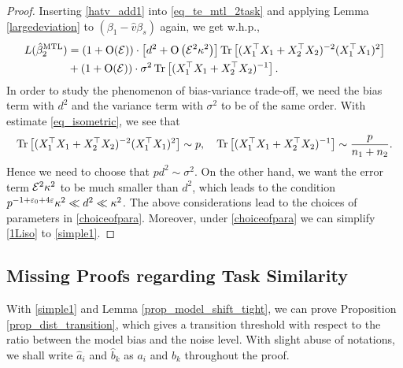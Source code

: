 \begin{proof}
Inserting \eqref{hatv_add1} into \eqref{eq_te_mtl_2task} and applying Lemma  \ref{largedeviation} to $(\beta_1-\hat v\beta_s)$ again, we get w.h.p.,
\begin{align}
\te(\hat{\beta}_2^{\MTL})&=(1+\OO(\cal E))\cdot \left[d^2 + \OO\left(\cal E^2 \kappa^2\right)\right] \tr\left[(X_1^{\top}X_1 +X_2^{\top}X_2)^{-2} (X_1^{\top}X_1)^2\right]\nonumber\\
&+(1+\OO(\cal E))\cdot \sigma^2  \bigtr{(X_1^{\top}X_1  + X_2^{\top}X_2)^{-1} }. \label{1Liso}
\end{align}
In order to study the phenomenon of bias-variance trade-off, we need the bias term with $d^2$ and the variance term with $\sigma^2$ to be of the same order. With estimate \eqref{eq_isometric}, we see that
$$\tr\left[(X_1^{\top}X_1 +X_2^{\top}X_2)^{-2} (X_1^{\top}X_1)^2\right] \sim p,\quad \bigtr{(X_1^{\top}X_1  + X_2^{\top}X_2)^{-1} } \sim \frac{p}{n_1+n_2}.$$
Hence we need to choose that $p d^2 \sim \sigma^2$. On the other hand, we want the error term $\cal E^2 \kappa^2$ to be much smaller than $d^2$, which leads to the condition $p^{-1+\e_0+4\e}\kappa^2  \ll d^2 \ll \kappa^2$. The above considerations lead to the choices of parameters in \eqref{choiceofpara}. Moreover, under \eqref{choiceofpara} we can simplify \eqref{1Liso} to \eqref{simple1}.
\end{proof}

\subsection{Missing Proofs regarding Task Similarity}\label{app_proof_31}

With \eqref{simple1} and Lemma \ref{prop_model_shift_tight}, we can prove Proposition \ref{prop_dist_transition}, which gives a transition threshold with respect to the ratio between the model bias and the noise level. With slight abuse of notations, we shall write $\hat a_i$ and $\hat b_k$ as $a_i$ and $b_k$ throughout the proof. 

